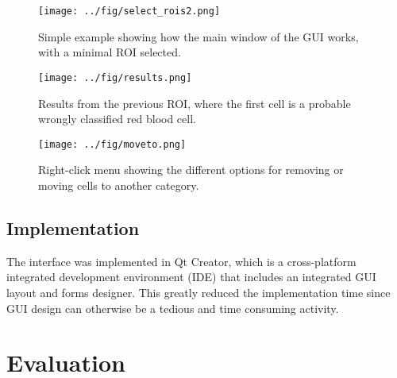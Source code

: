 \begin{figure}[h!]
    \centering
    \texttt{[image: ../fig/select\_rois2.png]}
    \caption{Simple example showing how the main window of the GUI works, with a minimal ROI selected.}
    \label{fig:select_rois}
\end{figure}

\begin{figure}[h!]
    \centering
    \texttt{[image: ../fig/results.png]}
    \caption{Results from the previous ROI, where the first cell is a probable wrongly classified red blood cell.}
    \label{fig:select_rois}
\end{figure}

\begin{figure}[h!]
    \centering
    \texttt{[image: ../fig/moveto.png]}
    \caption{Right-click menu showing the different options for removing or moving cells to another category.}
    \label{fig:select_rois}
\end{figure}


\subsection{Implementation}
The interface was implemented in Qt Creator, which is a cross-platform integrated development environment (IDE) that includes an integrated GUI layout and forms designer. This greatly reduced the implementation time since GUI design can otherwise be a tedious and time consuming activity. 

\section{Evaluation}\label{sec:research:history}
